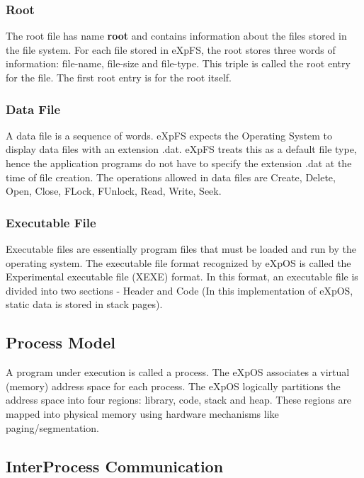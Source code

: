 \documentclass[10pt]{article}
\begin{document}
\subsubsection{Root}

The root file has name \textbf {root} and contains information about the files stored in the file system. For each file stored in eXpFS, the root stores three words of information: file-name, file-size and file-type. This triple is called the root entry for the file. The first root entry is for the root itself.  
\subsubsection{Data File}

A data file is a sequence of words. eXpFS expects the Operating System to display data files with an extension .dat.   eXpFS treats this as a default file type, hence the application programs do not have to specify the extension .dat at the time of file creation.  
The operations allowed in data files are Create, Delete, Open, Close, FLock, FUnlock, Read, Write, Seek.
\subsubsection{Executable File}

Executable files are essentially program files that must be loaded and run by the operating system. The executable file format recognized by eXpOS is called the Experimental executable file (XEXE) format. In this format, an executable file is divided into two sections - Header and Code (In this implementation of eXpOS, static data is stored in stack pages).
\subsection{Process Model}

A program under execution is called a process. The eXpOS associates a virtual (memory) address space for each process. The eXpOS logically partitions the address space into four regions: library, code, stack and heap. These regions are mapped into physical memory using hardware mechanisms like paging/segmentation.
\subsection{Inter\-Process Communication}
\end{document}
